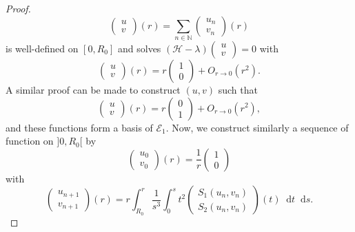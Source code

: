 \documentclass[11 pt]{amsart}
\theoremstyle{definition}
\theoremstyle{remark}
\numberwithin{equation}{section}
\newcommand{\dd}{\mathop{}\!\mathrm{d}}
\begin{document}
\begin{proof}
  \[ \left(\begin{array}{c}
       u\\
       v
     \end{array}\right) (r) = \sum_{n \in \mathbb{N}} \left(\begin{array}{c}
       u_n\\
       v_n
     \end{array}\right) (r) \]
  is well-defined on $[0, R_0]$ and solves $(\mathcal{H}- \lambda)
  \left(\begin{array}{c}
    u\\
    v
  \end{array}\right) = 0$ with
  \[ \left(\begin{array}{c}
       u\\
       v
     \end{array}\right) (r) = r \left(\begin{array}{c}
       1\\
       0
     \end{array}\right) + O_{r \rightarrow 0} (r^2) . \]
  A similar proof can be made to construct $(u, v)$ such that
  \[ \left(\begin{array}{c}
       u\\
       v
     \end{array}\right) (r) = r \left(\begin{array}{c}
       0\\
       1
     \end{array}\right) + O_{r \rightarrow 0} (r^2), \]
  and these functions form a basis of $\mathcal{E}_1$. Now, we construct
  similarly a sequence of function on $] 0, R_0 [$ by
  \[ \left(\begin{array}{c}
       u_0\\
       v_0
     \end{array}\right) (r) = \frac{1}{r} \left(\begin{array}{c}
       1\\
       0
     \end{array}\right) \]
  with
  \[ \left(\begin{array}{c}
       u_{n + 1}\\
       v_{n + 1}
     \end{array}\right) (r) = r \int_{R_0}^r \frac{1}{s^3} \int_0^s t^2
     \left(\begin{array}{c}
       S_1 (u_n, v_n)\\
       S_2 (u_n, v_n)
     \end{array}\right) (t) \dd t \dd s. \]

\end{proof}
\end{document}
